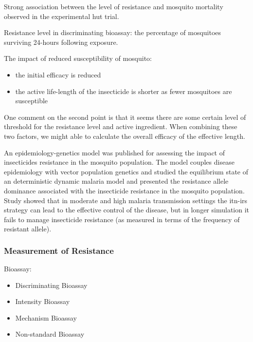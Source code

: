 \documentclass[a4paper, 12pt, twoside]{article}
\begin{document}
Strong association between the level of resistance and mosquito mortality observed in the experimental hut trial\cite{Sherrard-Smith2018b}.

Resistance level in discriminating bioassay: the percentage of mosquitoes surviving 24-hours following exposure.

The impact of reduced susceptibility of mosquito:
\begin{itemize}
	\item the initial efficacy is reduced
	\item the active life-length of the insecticide is shorter as fewer mosquitoes are susceptible
\end{itemize}


One comment on the second point is that it seems there are some certain level of threshold for the resistance level and active ingredient. When combining these two factors, we might able to calculate the overall efficacy of the effective length.

An epidemiology-genetics model was published\cite{Mohammed-Awel2019} for assessing the impact of insecticides resistance in the mosquito population.
The model couples disease epidemiology with vector population genetics and studied the equilibrium state of an deterministic dynamic malaria model and presented the resistance allele dominance associated with the insecticide resistance in the mosquito population.
Study showed that in moderate and high malaria transmission settings the \gls{itn}-\gls{irs} strategy can lead to the effective control of the disease, but in longer simulation it fails to manage insecticide resistance (as measured in terms of the frequency of resistant allele).

\subsubsection{Measurement of Resistance}

Bioassay:

\begin{itemize}
	\item Discriminating Bioassay
	\item Intensity Bioassay
	\item Mechanism Bioassay
	\item Non-standard Bioassay
\end{itemize}
\end{document}
